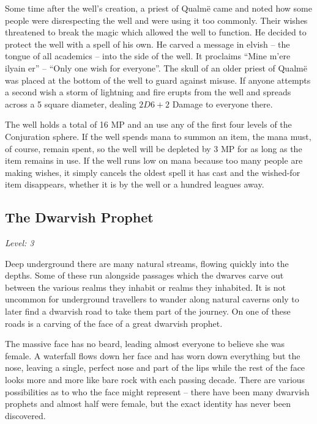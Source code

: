 \begin{multicols}{2}
Some time after the well's creation, a priest of Qualm\"{e} came and noted how some people were disrespecting the well and were using it too commonly.
Their wishes threatened to break the magic which allowed the well to function.
He decided to protect the well with a spell of his own.
He carved a message in elvish -- the tongue of all academics -- into the side of the well.
It proclaims ``Mine m'{e}re ilyain er'' -- ``Only one wish for everyone''.
The skull of an older priest of Qualm\"{e} was placed at the bottom of the well to guard against misuse.
If anyone attempts a second wish a storm of lightning and fire erupts from the well and spreads across a 5 square diameter, dealing $2D6+2$ Damage to everyone there.

The well holds a total of 16 MP and an use any of the first four levels of the Conjuration sphere.
If the well spends mana to summon an item, the mana must, of course, remain spent, so the well will be depleted by 3 MP for as long as the item remains in use.
If the well runs low on mana because too many people are making wishes, it simply cancels the oldest spell it has cast and the wished-for item disappears, whether it is by the well or a hundred leagues away.

\subsection{The Dwarvish Prophet}

\textit{Level: 3}

\noindent Deep underground there are many natural streams, flowing quickly into the depths.  Some of these run alongside passages which the dwarves carve out between the various realms they inhabit or realms they inhabited.  It is not uncommon for underground travellers to wander along natural caverns only to later find a dwarvish road to take them part of the journey.  On one of these roads is a carving of the face of a great dwarvish prophet.

\begin{boxtext}

	The massive face has no beard, leading almost everyone to believe she was female.
	A waterfall flows down her face and has worn down everything but the nose, leaving a single, perfect nose and part of the lips while the rest of the face looks more and more like bare rock with each passing decade.
	There are various possibilities as to who the face might represent -- there have been many dwarvish prophets and almost half were female, but the exact identity has never been discovered.


\end{boxtext}
\end{multicols}
